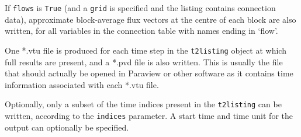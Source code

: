 If \texttt{flows} is \texttt{True} (and a \texttt{grid} is specified and the listing contains connection data), approximate block-average flux vectors at the centre of each block are also written, for all variables in the connection table with names ending in `flow'.

One *.vtu file is produced for each time step in the \texttt{t2listing} object at which full results are present, and a *.pvd file is also written.  This is usually the file that should actually be opened in Paraview or other software as it contains time information associated with each *.vtu file.

Optionally, only a subset of the time indices present in the \texttt{t2listing} can be written, according to the \texttt{indices} parameter.  A start time and time unit for the output can optionally be specified.

